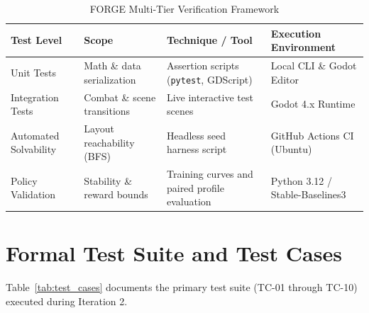 \begin{table}[!htbp]
\centering
\caption{FORGE Multi-Tier Verification Framework}
\label{tab:test_levels}
\small
\begin{tabular}{p{}p{}p{}p{}}
\toprule
\textbf{Test Level} & \textbf{Scope} & \textbf{Technique / Tool} & \textbf{Execution Environment} \\
\midrule
Unit Tests & Math \& data serialization & Assertion scripts (\texttt{pytest}, GDScript) & Local CLI \& Godot Editor \\
Integration Tests & Combat \& scene transitions & Live interactive test scenes & Godot 4.x Runtime \\
Automated Solvability & Layout reachability (BFS) & Headless seed harness script & GitHub Actions CI (Ubuntu) \\
Policy Validation & Stability \& reward bounds & Training curves and paired profile evaluation & Python 3.12 / Stable-Baselines3 \\
\bottomrule
\end{tabular}
\end{table}

\section{Formal Test Suite and Test Cases}
Table~\ref{tab:test_cases} documents the primary test suite (TC-01 through TC-10) executed during Iteration 2.

